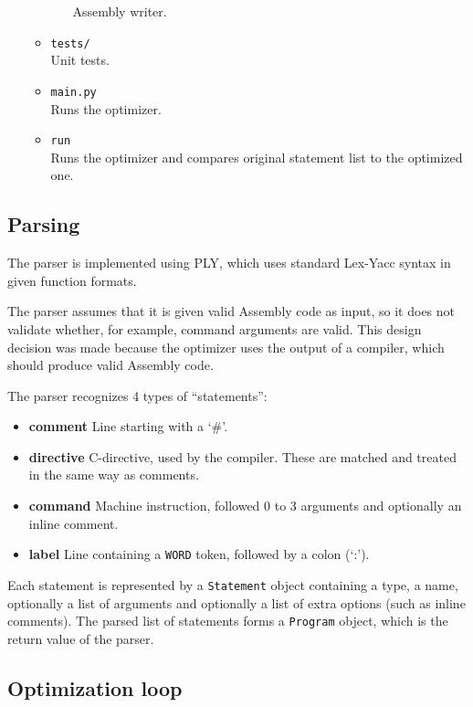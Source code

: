 \documentclass[10pt,a4paper]{article}
\begin{document}
\begin{itemize}
\begin{itemize}
\begin{itemize}
            Assembly writer.
        \end{itemize}
    \item \texttt{tests/} \\
        Unit tests.
    \item \texttt{main.py} \\
        Runs the optimizer.
    \item \texttt{run} \\
        Runs the optimizer and compares original statement list to the
        optimized one.
    \end{itemize}
\end{itemize}

\subsection{Parsing}

The parser is implemented using PLY, which uses standard Lex-Yacc syntax in
given function formats.

The parser assumes that it is given valid Assembly code as input, so it does
not validate whether, for example, command arguments are valid. This design
decision was made because the optimizer uses the output of a compiler, which
should produce valid Assembly code.

The parser recognizes 4 types of ``statements'':
\begin{itemize}
    \item \textbf{comment} Line starting with a `\#'.
    \item \textbf{directive} C-directive, used by the compiler. These are
                             matched and treated in the same way as comments.
    \item \textbf{command} Machine instruction, followed 0 to 3 arguments and
                           optionally an inline comment.
    \item \textbf{label} Line containing a \texttt{WORD} token, followed by a
                         colon (`:').
\end{itemize}

Each statement is represented by a \texttt{Statement} object containing a type,
a name, optionally a list of arguments and optionally a list of extra options
(such as inline comments). The parsed list of statements forms a
\texttt{Program} object, which is the return value of the parser.

\subsection{Optimization loop}
\end{document}
